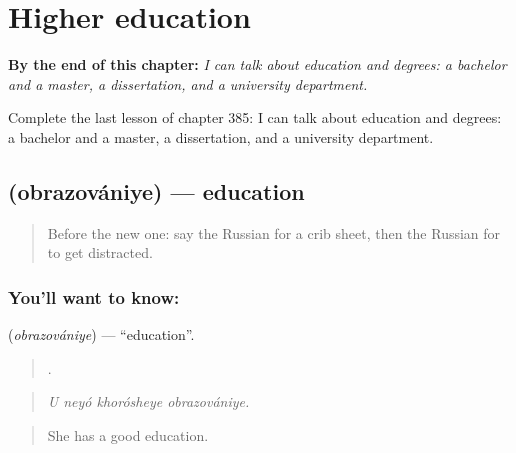 
\chapter{Higher education}
\label{ch:ru-higher-education}

\begin{chapteropening}
\textbf{By the end of this chapter:} \emph{I can talk about education and degrees: a bachelor and a master, a dissertation, and a university department.}

Complete the last lesson of chapter 385: I can talk about education and degrees: a bachelor and a master, a dissertation, and a university department.
\end{chapteropening}

\section[\texorpdfstring{\ru{образование} (obrazovániye)}{образование (obrazovániye)}]{ (obrazovániye) — education}

\label{lesson:RU-C385-obrazovanie}



\begin{quote}
Before the new one: say the Russian for a crib sheet, then the Russian for to get distracted.
\end{quote}

\subsection*{You'll want to know: }
\textbf{} (\emph{obrazovániye}) — \textquotedblleft{}education\textquotedblright{}.

\begin{quote}
   .
\end{quote}

\begin{quote}
\emph{U neyó khorósheye obrazovániye.}
\end{quote}

\begin{quote}
She has a good education.
\end{quote}

